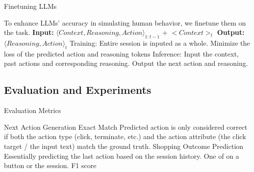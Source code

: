 \documentclass[scheme=plain,aspectratio=169]{beamer}
\begin{document}

\begin{frame}{Finetuning LLMs}
  \begin{outline}
    \1 To enhance LLMs' accuracy in simulating human behavior, we finetune them on the task.
    \2 \textbf{Input:} ${\langle Context, Reasoning, Action\rangle}_{1:t-1}$ + $<Context>_t$ 
    \2 \textbf{Output:} $\langle Reasoning, Action\rangle _{t}$
    \1 Training:
      \2 Entire session is inputed as a whole.
      \2 Minimize the loss of the predicted action and reasoning tokens
    \1 Inference:
      \2 Input the context, past actions and corresponding reasoning.
      \2 Output the next action and reasoning.
  \end{outline}
\end{frame}

\subsection{Evaluation and Experiments}

\begin{frame}{Evaluation Metrics}
  \begin{outline}
    \1 Next Action Generation
      \2 Exact Match
      \2 Predicted action is only considered correct if both the action type (click, terminate, etc.) and the action attribute (the click target / the input text) match the ground truth.
      \pause
    \1 Shopping Outcome Prediction
      \2 Essentially predicting the last action based on the session history.
      \2 One of  on a  button or  the session.
      \2 F1 score
  \end{outline}
\end{frame}

\end{document}
